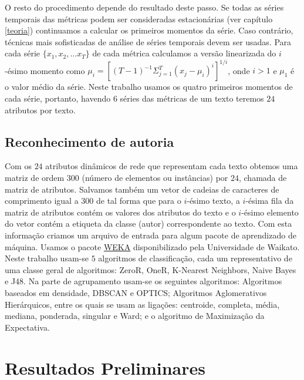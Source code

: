 \documentclass[a4paper,openright,12pt]{report} %
\begin{document}
O resto do procedimento depende do resultado deste passo. Se todas as s\'eries temporais das m\'etricas podem ser consideradas estacion\'arias (ver cap\'itulo \ref{teoria}) continuamos a calcular os primeiros momentos da s\'erie. Caso contr\'ario, t\'ecnicas mais sofisticadas de an\'alise de s\'eries temporais devem ser usadas. Para cada s\'erie $\{x_1, x_2, \dots x_T\}$ de cada m\'etrica calculamos a vers\~ao linearizada do $i$-\'esimo momento como $\mu_i=\left[ (T-1)^{-1} \Sigma_{j=1}^T (x_j-\mu_i)^i \right]^{1/i}$, onde $i>1$ e $\mu_1$ \'e o valor m\'edio da s\'erie. Neste trabalho usamos os quatro primeiros momentos de cada s\'erie, portanto, havendo $6$ s\'eries das m\'etricas de um texto teremos $24$ atributos por texto.\\


\section{Reconhecimento de autoria}

Com os $24$ atributos din\^amicos de rede que representam cada texto obtemos uma matriz de ordem $300$ (n\'umero de elementos ou inst\^ancias) por $24$, chamada de matriz de atributos. Salvamos tamb\'em um vetor de cadeias de caracteres de comprimento igual a $300$ de tal forma que para o $i$-\'esimo texto, a $i$-\'esima fila da matriz de atributos cont\'em os valores dos atributos do texto e o $i$-\'esimo elemento do vetor cont\'em a etiqueta da classe (autor) correspondente ao texto. Com esta informa\c c\~ao criamos um arquivo de entrada para algum pacote de aprendizado de m\'aquina. Usamos o pacote \href{http://www.cs.waikato.ac.nz/ml/weka/}{WEKA} disponibilizado pela Universidade de Waikato.\\

Neste trabalho usam-se $5$ algoritmos de classifica\c c\~ao, cada um representativo de uma classe geral de algoritmos: \textsf{ZeroR}, \textsf{OneR}, K-Nearest Neighbors, Naive Bayes e J$48$. Na parte de agrupamento usam-se os seguintes algoritmos: Algoritmos baseados em densidade, DBSCAN e OPTICS; Algoritmos Aglomerativos Hier\'arquicos, entre os quais se usam as liga\c c\~oes: centroide, completa, m\'edia, mediana, ponderada, singular e Ward; e o algoritmo de Maximiza\c c\~ao da Expectativa.\\



\chapter{Resultados Preliminares}
\end{document}
